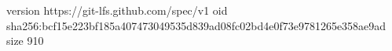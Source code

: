 version https://git-lfs.github.com/spec/v1
oid sha256:bcf15e223bf185a407473049535d839ad08fc02bd4e0f73e9781265e358ae9ad
size 910
